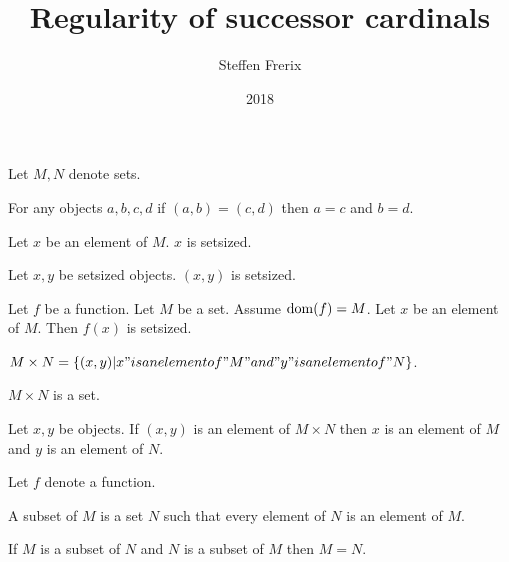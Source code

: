 \documentclass{article}
\title{Regularity of successor cardinals}
\author{Steffen Frerix}
\date{2018}
\newcommand{\Prod}[2]{#1\times #2}
\begin{document}

  \maketitle

  \begin{forthel}

    Let $M,N$ denote sets.

    \begin{axiom}
      For any objects $a,b,c,d$ if $(a,b) = (c,d)$ then $a = c$ and $b = d$.
    \end{axiom}

    \begin{axiom}
      Let $x$ be an element of $M$. $x$ is setsized.
    \end{axiom}

    \begin{axiom}
      Let $x,y$ be setsized objects. $(x, y)$ is setsized.
    \end{axiom}

    \begin{axiom}
      Let $f$ be a function. Let $M$ be a set. Assume $\operatorname{dom}(f) = M$.
      Let $x$ be an element of $M$. Then $f(x)$ is setsized.
    \end{axiom}

    \begin{definition}
      $\Prod{M}{N} = \{(x,y) | x "is an element of" M "and" y "is an element of" N\}$.
    \end{definition}

    \begin{axiom}
      $\Prod{M}{N}$ is a set.
    \end{axiom}

    \begin{lemma}
      Let $x,y$ be objects. If $(x,y)$ is an element of $\Prod{M}{N}$ then $x$ is an element of $M$ and $y$ is an element of $N$.
    \end{lemma}

    Let $f$ denote a function.

    \begin{definition}
      A subset of $M$ is a set $N$ such that every element of $N$ is an element of $M$.
    \end{definition}

    \begin{axiom}[Extensionality]
      If $M$ is a subset of $N$ and $N$ is a subset of $M$ then $M = N$.
    \end{axiom}


\end{forthel}
\end{document}
